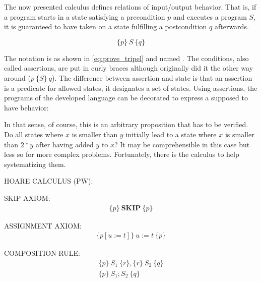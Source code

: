 The now presented  calculus defines relations of input/output behavior. That is, if a program starts in a state satisfying a precondition $p$ and executes a program $S$, it is guaranteed to have taken on a state fulfilling a postcondition $q$ afterwards.

\begin{equation}\label{eq:prove_tripel}
	\{p\}\ S\ \{q\}
\end{equation}

The notation is as shown in \eqref{eq:prove_tripel} and named . The conditions, also called assertions, are put in curly braces although  originally did it the other way around ($p\ \{S\}\ q$). The difference between assertion and state is that an assertion is a predicate for allowed states, it designates a set of states. Using assertions, the programs of the developed language can be decorated to express a supposed to have behavior:



In that sense, of course, this is an arbitrary proposition that has to be verified. Do all states where $x$ is smaller than $y$ initially lead to a state where $x$ is smaller than $2*y$ after having added $y$ to $x$? It may be comprehensible in this case but less so for more complex problems. Fortunately, there is the  calculus to help systematizing them.

\begin{center}
	HOARE CALCULUS (PW):
\end{center}

SKIP AXIOM:
\begin{equation}\label{eq:prove_pw_skip}
\begin{gathered}
	\{p\}\ \mathbf{SKIP}\ \{p\}
\end{gathered}
\end{equation}

ASSIGNMENT AXIOM:
\begin{equation}\label{eq:prove_pw_assign}
\begin{gathered}
	\{p[u:=t]\}\ u:=t\ \{p\}
\end{gathered}
\end{equation}

COMPOSITION RULE:
\begin{equation}\label{eq:prove_pw_comp}
\begin{gathered}
	\{p\}\ S_1\ \{r\},\{r\}\ S_2\ \{q\} \\
	\hline
	\{p\}\ S_1;S_2\ \{q\}
\end{gathered}
\end{equation}

